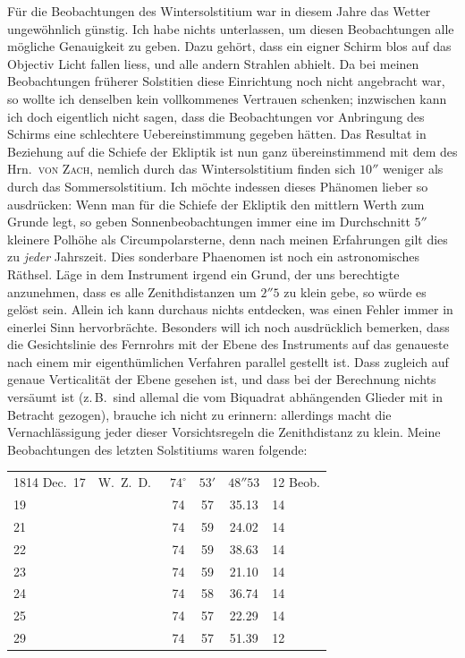 \par\indent Für die Beobachtungen des Wintersolstitium war in diesem Jahre das Wetter ungewöhnlich günstig. Ich habe nichts unterlassen, um diesen Beobachtungen alle mögliche Genauigkeit zu geben. Dazu gehört, dass ein eigner Schirm blos auf das Objectiv Licht fallen liess, und alle andern Strahlen abhielt. Da bei meinen Beobachtungen früherer Solstitien diese Einrichtung noch nicht angebracht war, so wollte ich denselben kein vollkommenes Vertrauen schenken; inzwischen kann ich doch eigentlich nicht sagen, dass die Beobachtungen vor Anbringung des Schirms eine schlechtere Uebereinstimmung gegeben hätten. Das Resultat in Beziehung auf die Schiefe der Ekliptik ist nun ganz übereinstimmend mit dem des Hrn.\ \textsc{von Zach}, nemlich durch das Wintersolstitium finden sich $10''$ weniger als durch das Sommersolstitium. Ich möchte indessen dieses Phänomen lieber so ausdrücken: Wenn man für die Schiefe der Ekliptik den mittlern Werth zum Grunde legt, so geben Sonnenbeobachtungen immer eine im Durchschnitt $5''$ kleinere Polhöhe als Circumpolarsterne, denn nach meinen Erfahrungen gilt dies zu \emph{jeder} Jahrszeit. Dies sonderbare Phaenomen ist noch ein astronomisches Räthsel. Läge in dem Instrument irgend ein Grund, der uns berechtigte anzunehmen, dass es alle Zenithdistanzen um $2''5$ zu klein gebe, so würde es gelöst sein. Allein ich kann durchaus nichts entdecken, was einen Fehler immer in einerlei Sinn hervorbrächte. Besonders will ich noch ausdrücklich bemerken, dass die Gesichtslinie des Fernrohrs mit der Ebene des Instruments auf das genaueste nach einem mir eigenthümlichen Verfahren parallel gestellt ist. Dass zugleich auf genaue Verticalität der Ebene gesehen ist, und dass bei der Berechnung nichts versäumt ist (z.\,B.\ sind allemal die vom Biquadrat abhängenden Glieder mit in Betracht gezogen), brauche ich nicht zu erinnern: allerdings macht die Vernachlässigung jeder dieser Vorsichtsregeln die Zenithdistanz zu klein. Meine Beobachtungen des letzten Solstitiums waren folgende:

\begin{center}
\fontsize{10}{12}\selectfont\setlength{\tabcolsep}{5pt}\renewcommand{\arraystretch}{1.15}\begin{tabular}{l l ccc l}
1814 Dec.\ 17 & W.\ Z.\ D.\ & $74^\circ$ & $53'$ & $48''53$ & 12 Beob. \\
19 & & 74 & 57 & 35.13 & 14 \\
21 & & 74 & 59 & 24.02 & 14 \\
22 & & 74 & 59 & 38.63 & 14 \\
23 & & 74 & 59 & 21.10 & 14 \\
24 & & 74 & 58 & 36.74 & 14 \\
25 & & 74 & 57 & 22.29 & 14 \\
29 & & 74 & 57 & 51.39 & 12 \\
\end{tabular}
\end{center}

